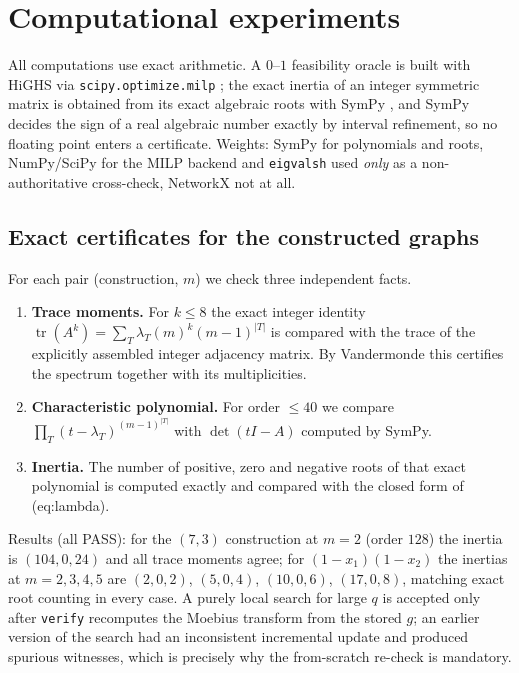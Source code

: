 \documentclass[11pt,a4paper]{article}
\theoremstyle{plain}
\theoremstyle{definition}
\begin{document}
\section{Computational experiments}
\label{sec:exp}

All computations use exact arithmetic.  A $0$--$1$ feasibility oracle is built with HiGHS
via \texttt{scipy.optimize.milp} \cite{SciPy2020,HuangfuHall2018}; the exact inertia of
an integer symmetric matrix is obtained from its exact algebraic roots with SymPy
\cite{SymPy2011}, and SymPy decides the sign of a real algebraic number exactly by
interval refinement, so no floating point enters a certificate.  Weights: SymPy for
polynomials and roots, NumPy/SciPy for the MILP backend and \texttt{eigvalsh} used \emph{only}
as a non-authoritative cross-check, NetworkX \cite{NetworkX2020} not at all.

\subsection{Exact certificates for the constructed graphs}
\label{sec:certs}

For each pair (construction, $m$) we check three independent facts.
\begin{enumerate}
\item \textbf{Trace moments.}  For $k\le 8$ the exact integer identity
      $\operatorname{tr}(A^k)=\sum_T\lambda_T(m)^k(m-1)^{|T|}$ is compared with the trace
      of the explicitly assembled integer adjacency matrix.  By Vandermonde this
      certifies the spectrum together with its multiplicities.
\item \textbf{Characteristic polynomial.}  For order $\le 40$ we compare
      $\prod_T(t-\lambda_T)^{(m-1)^{|T|}}$ with $\det(tI-A)$ computed by SymPy.
\item \textbf{Inertia.}  The number of positive, zero and negative roots of that exact
      polynomial is computed exactly and compared with the closed form of
      \textup{(eq:lambda)}.
\end{enumerate}
Results (all PASS): for the $(7,3)$ construction at $m=2$ (order $128$) the inertia is
$(104,0,24)$ and all trace moments agree; for $(1-x_1)(1-x_2)$ the inertias at
$m=2,3,4,5$ are $(2,0,2)$, $(5,0,4)$, $(10,0,6)$, $(17,0,8)$, matching exact root
counting in every case.  A purely local search for large $q$ is accepted only after
\texttt{verify} recomputes the Moebius transform from the stored $g$; an earlier version
of the search had an inconsistent incremental update and produced spurious witnesses,
which is precisely why the from-scratch re-check is mandatory.
\end{document}
